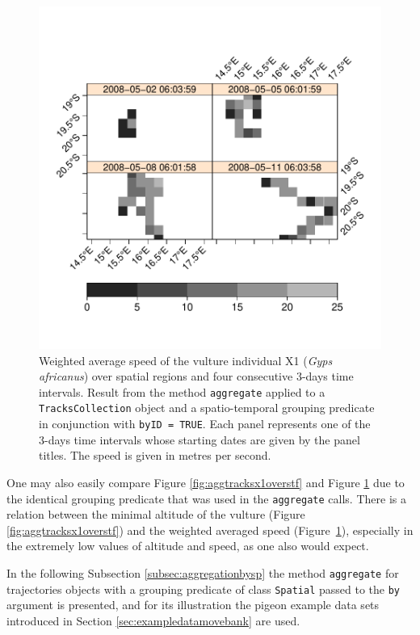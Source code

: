 \documentclass[12pt, oneside, a4paper]{scrbook}
\newcommand{\pkg}[1]{{\normalfont\fontseries{b}\selectfont #1}}
\let\code=\texttt
\begin{document}
\begin{figure}[!htb]
\centering
\includegraphics{trajagg-agg_stf_vulture_TrC_fig_2}
\caption[Weighted average speed of a vulture obtained by aggregation over spatio-temporal geometries.]{Weighted average speed of the vulture individual X1 (\textit{Gyps africanus}) over spatial regions and four consecutive 3-days time intervals. Result from the method \code{aggregate} applied to a \code{TracksCollection} object and a spatio-temporal grouping predicate in conjunction with \code{byID = TRUE}. Each panel represents one of the 3-days time intervals whose starting dates are given by the panel titles. The speed is given in metres per second.}
\label{fig:aggtrackscolloverstf}
\end{figure}


One may also easily compare Figure \ref{fig:aggtracksx1overstf} and Figure \ref{fig:aggtrackscolloverstf} due to the identical grouping predicate that was used in the \code{aggregate} calls.
There is a relation between the minimal altitude of the vulture (Figure \ref{fig:aggtracksx1overstf}) and the weighted averaged speed (Figure~\ref{fig:aggtrackscolloverstf}), especially in the extremely low values of altitude and speed, as one also would expect. 
\par\medskip

In the following Subsection \ref{subsec:aggregationbysp} the method \code{aggregate} for \pkg{trajectories} objects with a grouping predicate of class \code{Spatial} passed to the \code{by} argument is presented, and for its illustration the pigeon example data sets introduced in Section \ref{sec:exampledatamovebank} are used.
\par\medskip
\end{document}

